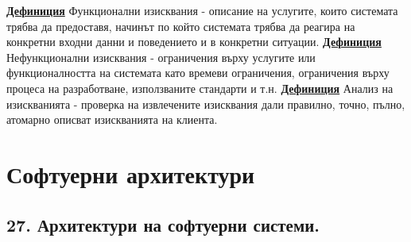 \documentclass{article}
\begin{document}
\textbf{\underline{Дефиниция}}
Функционални изисквания - описание на услугите, които системата трябва да предоставя, начинът по който системата трябва да реагира
на конкретни входни данни и поведението и в конкретни ситуации. \newline\newline
\textbf{\underline{Дефиниция}}
Нефункционални изисквания - ограничения върху услугите или функционалността на системата като времеви ограничения, ограничения
върху процеса на разработване, използваните стандарти и т.н. \newline\newline
\textbf{\underline{Дефиниция}}
Анализ на изискванията - проверка на извлечените изисквания дали правилно, точно, пълно, атомарно описват изискванията на клиента. \newline

\section*{\centering \color{bordeaux}Софтуерни архитектури}

\subsection*{\color{bordeaux}27. Архитектури на софтуерни системи.}
\end{document}

